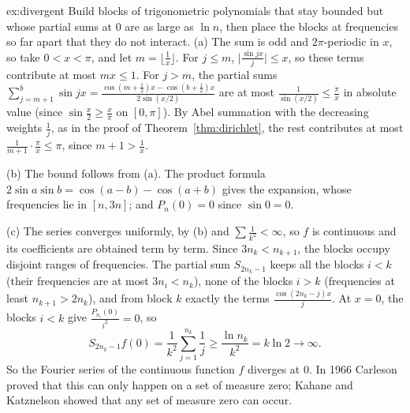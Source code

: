 \begin{solution}{ex:divergent}
\idea Build blocks of trigonometric polynomials that stay bounded but whose partial sums at $0$ are as large as $\ln n$, then
place the blocks at frequencies so far apart that they do not interact.
\writeup (a) The sum is odd and $2\pi$-periodic in $x$, so take $0<x<\pi$, and let $m=\lfloor\frac1x\rfloor$. For $j\le m$, $\bigl|\frac{\sin jx}j\bigr|\le x$, so these
terms contribute at most $mx\le1$. For $j>m$, the partial sums $\sum_{j=m+1}^b\sin jx=\frac{\cos(m+\frac12)x-\cos(b+\frac12)x}{2\sin(x/2)}$ are at most $\frac1{\sin(x/2)}\le\frac\pi x$
in absolute value (since $\sin\frac x2\ge\frac x\pi$ on $[0,\pi]$). By Abel summation with the decreasing weights $\frac1j$, as in the proof of
Theorem~\ref{thm:dirichlet}, the rest contributes at most $\frac1{m+1}\cdot\frac\pi x\le\pi$, since $m+1>\frac1x$.

(b) The bound follows from (a). The product formula $2\sin a\sin b=\cos(a-b)-\cos(a+b)$ gives the expansion, whose frequencies lie in
$[n,3n]$; and $P_n(0)=0$ since $\sin0=0$.

(c) The series converges uniformly, by (b) and $\sum\frac1{k^2}<\infty$, so $f$ is continuous and its coefficients are obtained term by
term. Since $3n_k<n_{k+1}$, the blocks occupy disjoint ranges of frequencies. The partial sum $S_{2n_k-1}$ keeps all the blocks
$i<k$ (their frequencies are at most $3n_i<n_k$), none of the blocks $i>k$ (frequencies at least $n_{k+1}>2n_k$), and from block $k$ exactly the terms
$\frac{\cos(2n_k-j)x}{j}$. At $x=0$, the blocks $i<k$ give $\frac{P_{n_i}(0)}{i^2}=0$, so
\[
S_{2n_k-1}f(0)=\frac1{k^2}\sum_{j=1}^{n_k}\frac1j\ge\frac{\ln n_k}{k^2}=k\ln2\to\infty.
\]
So the Fourier series of the continuous function $f$ diverges at $0$. In 1966 Carleson proved that this can only happen on a set
of measure zero; Kahane and Katznelson showed that any set of measure zero can occur.
\end{solution}

